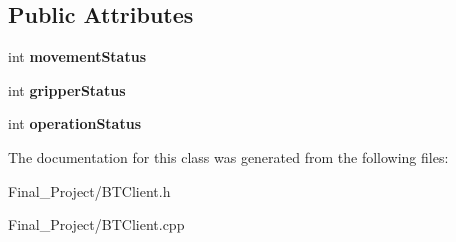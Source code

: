 \subsection*{Public Attributes}
\begin{DoxyCompactItemize}
\item 
\hypertarget{classBTClient_aacff467239e0a6a85eab0ac77dbcfdf8}{int {\bfseries movement\-Status}}\label{classBTClient_aacff467239e0a6a85eab0ac77dbcfdf8}

\item 
\hypertarget{classBTClient_acdb5a8d964742a7236d2d0acc2e45585}{int {\bfseries gripper\-Status}}\label{classBTClient_acdb5a8d964742a7236d2d0acc2e45585}

\item 
\hypertarget{classBTClient_a419405603d661e07e630a6649e9592a0}{int {\bfseries operation\-Status}}\label{classBTClient_a419405603d661e07e630a6649e9592a0}

\end{DoxyCompactItemize}


The documentation for this class was generated from the following files\-:\begin{DoxyCompactItemize}
\item 
Final\-\_\-\-Project/B\-T\-Client.\-h\item 
Final\-\_\-\-Project/B\-T\-Client.\-cpp\end{DoxyCompactItemize}

